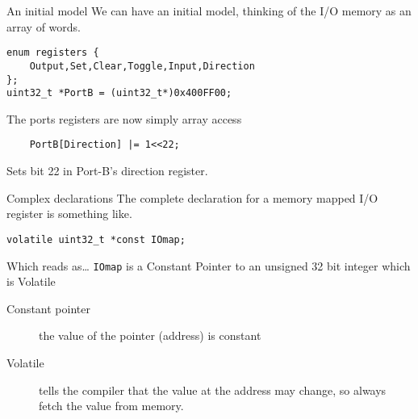 \documentclass[xcolor=svgnames]{beamer}
\begin{document}
\begin{frame}[fragile]{An initial model}
    We can have an initial model, thinking of the I/O memory as an array of words.

    \begin{tcolorbox}
        \begin{verbatim}
enum registers {
    Output,Set,Clear,Toggle,Input,Direction
};
uint32_t *PortB = (uint32_t*)0x400FF00;
        \end{verbatim}
    \end{tcolorbox}

    The ports registers are now simply array access

    \begin{tcolorbox}
        \begin{verbatim}
    PortB[Direction] |= 1<<22;
        \end{verbatim}
    \end{tcolorbox}
    Sets bit 22 in Port-B's direction register.
\end{frame}

\begin{frame}[fragile]{Complex declarations}
    The complete declaration for a memory mapped I/O register is something like.
    \begin{tcolorbox}
        \begin{verbatim}
volatile uint32_t *const IOmap;
        \end{verbatim}
    \end{tcolorbox}
    Which reads as\ldots
    \texttt{IOmap} is a \alert{Constant} \alert{Pointer} to an \alert{unsigned 32 bit integer} which is \alert{Volatile}
    \begin{description}
        \item[Constant pointer] the value of the pointer (address) is constant
        \item[Volatile] tells the compiler that the value at the address may change, so always fetch the value from memory.
    \end{description}
\end{frame}
\end{document}
